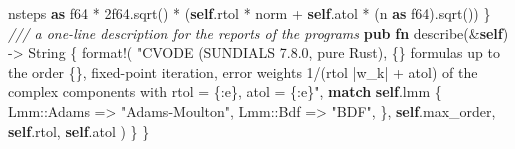 \documentclass[
  10pt,
]{article}
\newenvironment{Shaded}{}{}
\newcommand{\CommentTok}[1]{\textcolor[rgb]{0.38,0.63,0.69}{\textit{#1}}}
\newcommand{\ControlFlowTok}[1]{\textcolor[rgb]{0.00,0.44,0.13}{\textbf{#1}}}
\newcommand{\DataTypeTok}[1]{\textcolor[rgb]{0.56,0.13,0.00}{#1}}
\newcommand{\DecValTok}[1]{\textcolor[rgb]{0.25,0.63,0.44}{#1}}
\newcommand{\KeywordTok}[1]{\textcolor[rgb]{0.00,0.44,0.13}{\textbf{#1}}}
\newcommand{\NormalTok}[1]{#1}
\newcommand{\OperatorTok}[1]{\textcolor[rgb]{0.40,0.40,0.40}{#1}}
\newcommand{\PreprocessorTok}[1]{\textcolor[rgb]{0.74,0.48,0.00}{#1}}
\newcommand{\StringTok}[1]{\textcolor[rgb]{0.25,0.44,0.63}{#1}}
\begin{document}
\begin{Shaded}
\begin{Highlighting}[]
\NormalTok{        nsteps }\KeywordTok{as} \DataTypeTok{f64} \OperatorTok{*} \DecValTok{2f64}\OperatorTok{.}\NormalTok{sqrt() }\OperatorTok{*}\NormalTok{ (}\KeywordTok{self}\OperatorTok{.}\NormalTok{rtol }\OperatorTok{*}\NormalTok{ norm }\OperatorTok{+} \KeywordTok{self}\OperatorTok{.}\NormalTok{atol }\OperatorTok{*}\NormalTok{ (n }\KeywordTok{as} \DataTypeTok{f64}\NormalTok{)}\OperatorTok{.}\NormalTok{sqrt())}
    \OperatorTok{\}}
    \CommentTok{/// a one{-}line description for the reports of the programs}
    \KeywordTok{pub} \KeywordTok{fn}\NormalTok{ describe(}\OperatorTok{\&}\KeywordTok{self}\NormalTok{) }\OperatorTok{{-}\textgreater{}} \DataTypeTok{String} \OperatorTok{\{}
        \PreprocessorTok{format!}\NormalTok{(}
            \StringTok{"CVODE (SUNDIALS 7.8.0, pure Rust), \{\} formulas up to the order \{\}, fixed{-}point iteration, error weights 1/(rtol |w\_k| + atol) of the complex components with rtol = \{:e\}, atol = \{:e\}"}\OperatorTok{,}
            \ControlFlowTok{match} \KeywordTok{self}\OperatorTok{.}\NormalTok{lmm }\OperatorTok{\{}
                \PreprocessorTok{Lmm::}\NormalTok{Adams }\OperatorTok{=\textgreater{}} \StringTok{"Adams{-}Moulton"}\OperatorTok{,}
                \PreprocessorTok{Lmm::}\NormalTok{Bdf }\OperatorTok{=\textgreater{}} \StringTok{"BDF"}\OperatorTok{,}
            \OperatorTok{\},}
            \KeywordTok{self}\OperatorTok{.}\NormalTok{max\_order}\OperatorTok{,}
            \KeywordTok{self}\OperatorTok{.}\NormalTok{rtol}\OperatorTok{,}
            \KeywordTok{self}\OperatorTok{.}\NormalTok{atol}
\NormalTok{        )}
    \OperatorTok{\}}
\OperatorTok{\}}


\end{Highlighting}
\end{Shaded}
\end{document}
